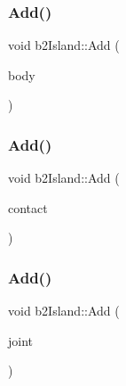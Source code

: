 \subsubsection{\texorpdfstring{Add()}{Add()}\hspace{0.1cm}{\footnotesize\ttfamily [1/3]}}
{\footnotesize\ttfamily void b2\+Island\+::\+Add (\begin{DoxyParamCaption}\item[{\mbox{\hyperlink{classb2_body}{b2\+Body}} $\ast$}]{body }\end{DoxyParamCaption})\hspace{0.3cm}{\ttfamily [inline]}}

\mbox{\label{classb2_island_abc0ea9208e818b551404fd507f197a51}} 
\subsubsection{\texorpdfstring{Add()}{Add()}\hspace{0.1cm}{\footnotesize\ttfamily [2/3]}}
{\footnotesize\ttfamily void b2\+Island\+::\+Add (\begin{DoxyParamCaption}\item[{\mbox{\hyperlink{classb2_contact}{b2\+Contact}} $\ast$}]{contact }\end{DoxyParamCaption})\hspace{0.3cm}{\ttfamily [inline]}}

\mbox{\label{classb2_island_a04e6ccd0c11f6ef5a7ed0a926d081445}} 
\subsubsection{\texorpdfstring{Add()}{Add()}\hspace{0.1cm}{\footnotesize\ttfamily [3/3]}}
{\footnotesize\ttfamily void b2\+Island\+::\+Add (\begin{DoxyParamCaption}\item[{\mbox{\hyperlink{classb2_joint}{b2\+Joint}} $\ast$}]{joint }\end{DoxyParamCaption})\hspace{0.3cm}{\ttfamily [inline]}}

\mbox{\label{classb2_island_a26566f7388fcaf7523446e5e76d99c4d}} 
